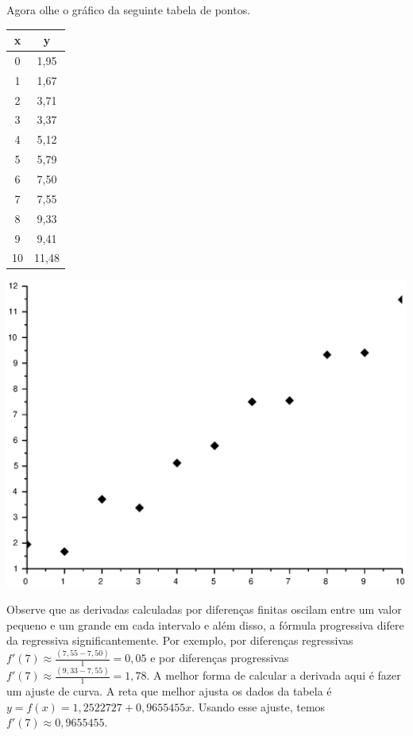 Agora olhe o gráfico da seguinte tabela de pontos.
\begin{center}
\begin{tabular}{|c|c|}
\hline
x&y\\
\hline
0    & 1,95  \\
\hline
    1&     1,67  \\
		\hline
    2 &    3,71  \\
		\hline
    3  &   3,37  \\
		\hline
    4   &  5,12   \\
		\hline
    5&     5,79  \\
		\hline
    6 &    7,50  \\
		\hline
    7  &   7,55  \\
		\hline
    8   &  9,33  \\
		\hline
    9   &  9,41   \\
		\hline
    10  &  11,48  \\
		\hline
\end{tabular}  
\end{center}
\begin{center}
\includegraphics[scale=0.5]{./cap_derivacao/pics/graf_der.eps}
\end{center}

Observe que as derivadas calculadas por diferenças finitas oscilam entre um valor pequeno e um grande em cada intervalo e além disso, a fórmula progressiva difere da regressiva significantemente. Por exemplo, por diferenças regressivas $f'(7)\approx \frac{(7,55 -  7,50)}{1}=0,05$ e por diferenças progressivas $f'(7)\approx \frac{(9,33 -  7,55)}{1}=1,78$. A melhor forma de calcular a derivada aqui é fazer um ajuste de curva. A reta que melhor ajusta os dados da tabela é $y=f(x)=1,2522727+0,9655455x$. Usando esse ajuste, temos $f'(7)\approx 0,9655455$.

